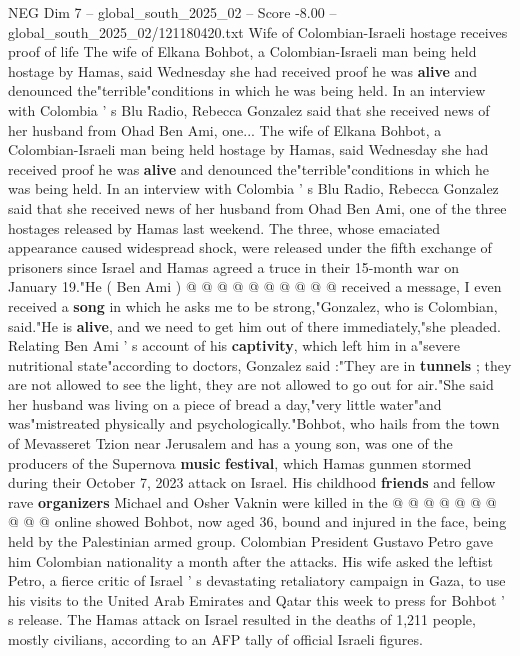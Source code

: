 \begin{textsample}{NEG Dim 7 – global\_south\_2025\_02 – Score -8.00 – global\_south\_2025\_02/121180420.txt}  \label{ex:f7_neg_265}
Wife of Colombian-Israeli hostage receives proof of life The wife of Elkana Bohbot, a Colombian-Israeli man being held hostage by Hamas, said Wednesday she had received proof he was \textbf{alive} and denounced the"terrible"conditions in which he was being held.
In an interview with Colombia ' s Blu Radio, Rebecca Gonzalez said that she received news of her husband from Ohad Ben Ami, one...
The wife of Elkana Bohbot, a Colombian-Israeli man being held hostage by Hamas, said Wednesday she had received proof he was \textbf{alive} and denounced the"terrible"conditions in which he was being held.
In an interview with Colombia ' s Blu Radio, Rebecca Gonzalez said that she received news of her husband from Ohad Ben Ami, one of the three hostages released by Hamas last weekend.
The three, whose emaciated appearance caused widespread shock, were released under the fifth exchange of prisoners since Israel and Hamas agreed a truce in their 15-month war on January 19."He ( Ben Ami ) @ @ @ @ @ @ @ @ @ @ received a message, I even received a \textbf{song} in which he asks me to be strong,"Gonzalez, who is Colombian, said."He is \textbf{alive}, and we need to get him out of there immediately,"she pleaded.
Relating Ben Ami ' s account of his \textbf{captivity}, which left him in a"severe nutritional state"according to doctors, Gonzalez said :"They are in \textbf{tunnels} ; they are not allowed to see the light, they are not allowed to go out for air."She said her husband was living on a piece of bread a day,"very little water"and was"mistreated physically and psychologically."Bohbot, who hails from the town of Mevasseret Tzion near Jerusalem and has a young son, was one of the producers of the Supernova \textbf{music} \textbf{festival}, which Hamas gunmen stormed during their October 7, 2023 attack on Israel.
His childhood \textbf{friends} and fellow rave \textbf{organizers} Michael and Osher Vaknin were killed in the @ @ @ @ @ @ @ @ @ @ online showed Bohbot, now aged 36, bound and injured in the face, being held by the Palestinian armed group.
Colombian President Gustavo Petro gave him Colombian nationality a month after the attacks.
His wife asked the leftist Petro, a fierce critic of Israel ' s devastating retaliatory campaign in Gaza, to use his visits to the United Arab Emirates and Qatar this week to press for Bohbot ' s release.
The Hamas attack on Israel resulted in the deaths of 1,211 people, mostly civilians, according to an AFP tally of official Israeli figures.

\end{textsample}
